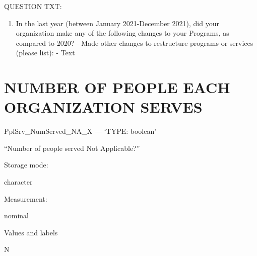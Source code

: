 \documentclass[
  letterpaper,
]{scrbook}
\providecommand{\tightlist}{%
  \setlength{\itemsep}{0pt}\setlength{\parskip}{0pt}}\usepackage{longtable,booktabs,array}
\begin{document}
\begin{enumerate}
\begin{enumerate}
\begin{enumerate}
\begin{enumerate}
\begin{enumerate}
\begin{enumerate}
\begin{enumerate}
\begin{enumerate}
\begin{enumerate}
\begin{enumerate}
\begin{enumerate}
\begin{enumerate}
\begin{enumerate}
\begin{enumerate}
                            QUESTION TXT:

                            \begin{enumerate}
                            \def\labelenumxv{\arabic{enumxv}.}
                            \tightlist
                            \item
                              In the last year (between January
                              2021-December 2021), did your organization
                              make any of the following changes to your
                              Programs, as compared to 2020? - Made
                              other changes to restructure programs or
                              services (please list): - Text
                            \end{enumerate}
                          \end{enumerate}
                        \end{enumerate}
                      \end{enumerate}
                    \end{enumerate}
                  \end{enumerate}
                \end{enumerate}
              \end{enumerate}
            \end{enumerate}
          \end{enumerate}
        \end{enumerate}
      \end{enumerate}
    \end{enumerate}
  \end{enumerate}
\end{enumerate}

\chapter{NUMBER OF PEOPLE EACH ORGANIZATION
SERVES}\label{number-of-people-each-organization-serves}

PplSrv\_NumServed\_NA\_X --- {`TYPE: boolean'}

``Number of people served Not Applicable?''

Storage mode:

character

Measurement:

nominal

Values and labels

N
\end{document}
